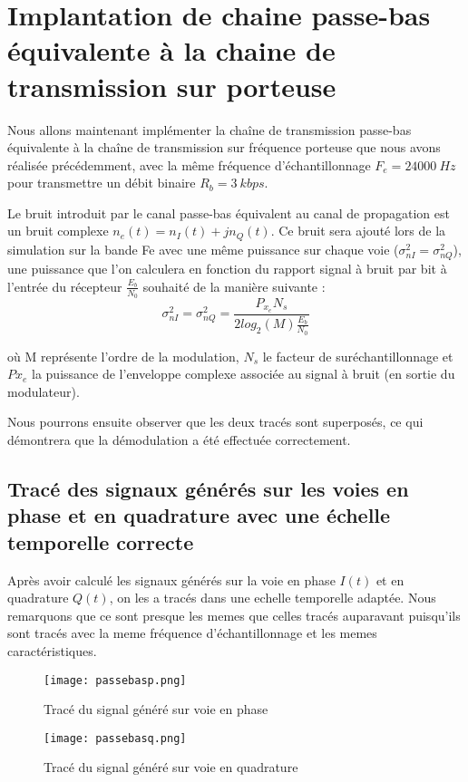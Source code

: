 \documentclass[11pt]{article}
\begin{document}
\section{Implantation de chaine passe-bas équivalente à la chaine de transmission sur porteuse}

Nous allons maintenant implémenter la chaîne de transmission passe-bas équivalente à la chaîne de transmission sur fréquence porteuse que nous avons réalisée précédemment, avec la même fréquence d'échantillonnage $F_e = 24000 \ Hz$ pour transmettre un débit binaire $R_b = 3 \ kbps$.

Le bruit introduit par le canal passe-bas équivalent au canal de propagation est un bruit complexe $n_e(t) = n_I(t) + jn_Q(t)$. Ce bruit sera ajouté lors de la simulation sur la bande Fe avec une même puissance sur chaque voie ($\sigma_{nI}^2 = \sigma_{nQ}^2$), une puissance que l'on calculera en fonction du rapport signal à bruit par bit à l'entrée du récepteur $\frac{E_b}{N_0}$ souhaité de la manière suivante :
$$\sigma_{nI}^2 = \sigma_{nQ}^2 = \frac{P_{x_e}N_s}{2log_2(M)\frac{E_b}{N_0}}$$

où M représente l'ordre de la modulation, $N_s$ le facteur de suréchantillonnage et $P{x_e}$ la puissance de l'enveloppe complexe associée au signal à bruit (en sortie du modulateur).

Nous pourrons ensuite observer que les deux tracés sont superposés, ce qui démontrera que la démodulation a été effectuée correctement.
\subsection{ Tracé des signaux générés sur les voies en phase et en quadrature avec une échelle temporelle correcte}
Après avoir calculé les signaux générés sur la voie en phase $I(t)$ et en quadrature $Q(t)$, on les a tracés dans une echelle temporelle adaptée. Nous remarquons que ce sont presque les memes que celles tracés auparavant puisqu'ils sont tracés avec la meme fréquence d'échantillonnage et les memes caractéristiques.

\begin{figure}[ht!]
    \centering
    \texttt{[image: passebasp.png]}
    \caption{Tracé du signal généré sur voie en phase  \label{fig : PasseBasPhase}}
\end{figure}

\begin{figure}[ht!]
    \centering
    \texttt{[image: passebasq.png]}
    \caption{Tracé du signal généré sur voie en quadrature  \label{fig : PasseBasQuadrature}}
\end{figure}
\end{document}

